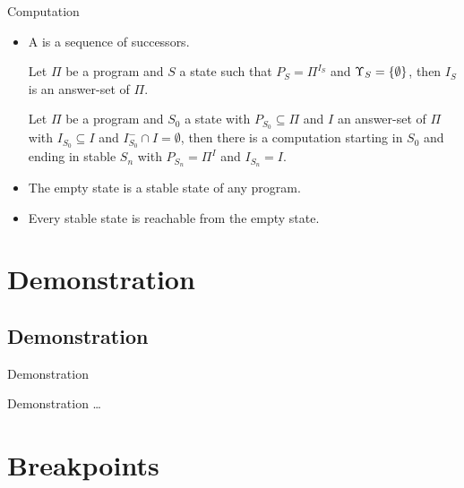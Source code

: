 \documentclass[trans,draft]{beamer} %
\begin{document}
\begin{frame}{Computation}

	\begin{itemize}
		\item A \emph{} is a sequence of successors.
		\pause
		\begin{theorem}[Soundness]
			Let $\Pi$ be a program and $S$ a state such that\newline
			$P_S = \Pi^{I_S}$ and $\Upsilon_S = \left\{{\emptyset}\right\}$, then
			$I_S$ is an answer-set of $\Pi$.
		\end{theorem}
		\pause
		\begin{theorem}[Completeness]
			Let $\Pi$ be a program and $S_0$ a state with $P_{S_0} \subseteq \Pi$ and\newline
			$I$ an answer-set of $\Pi$ with $I_{S_0} \subseteq I$ and $I^-_{S_0} \cap I = \emptyset$, then\newline
			there is a computation starting in $S_0$ and ending in stable $S_n$ with
			$P_{S_n} = \Pi^I$ and $I_{S_n} = I$.
		\end{theorem}
		\pause
		\item The empty state is a stable state of any program.
		\item Every stable state is reachable from the empty state.
	\end{itemize}

\end{frame}



\section{Demonstration}


\subsection{Demonstration}

\begin{frame}{Demonstration}

	\begin{center}
		Demonstration \ldots
	\end{center}

\end{frame}



\section{Breakpoints}
\end{document}
